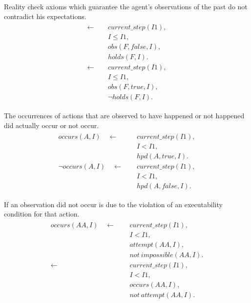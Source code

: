\documentclass[11pt, oneside]{article}
\begin{document}
Reality check axioms which guarantee the agent's observations of the past do not contradict his expectations.
\begin{align}\begin{split}
\leftarrow \quad\ &current\_step(I1),\\
&I \leq I1,\\
&obs(F, false, I),\\
&holds(F, I).\\
\leftarrow \quad\ &current\_step(I1),\\
&I \leq I1,\\
&obs(F, true, I),\\
&\neg holds(F, I).
\end{split}\end{align}

The occurrences of actions that are observed to have happened or not happened did actually occur or not occur.
\begin{align}\begin{split}
occurs(A, I)  \quad \leftarrow \quad\ &current\_step(I1),\\
&I < I1,\\
&hpd(A, true, I).\\
\neg occurs(A, I) \quad \leftarrow \quad\ &current\_step(I1),\\
&I < I1,\\
&hpd(A, false, I).
\end{split}\end{align}

If an observation did not occur is due to the violation of an executability condition for that action.
\begin{align}\begin{split}
occurs(AA, I)  \quad \leftarrow \quad\ &current\_step(I1),\\
&I<I1,\\
&attempt(AA,I),\\
&not\ impossible(AA,I).\\
\leftarrow \quad\ &current\_step(I1),\\
&I<I1,\\
&occurs(AA,I),\\
&not\ attempt(AA,I).
\end{split}\end{align}
\end{document}
